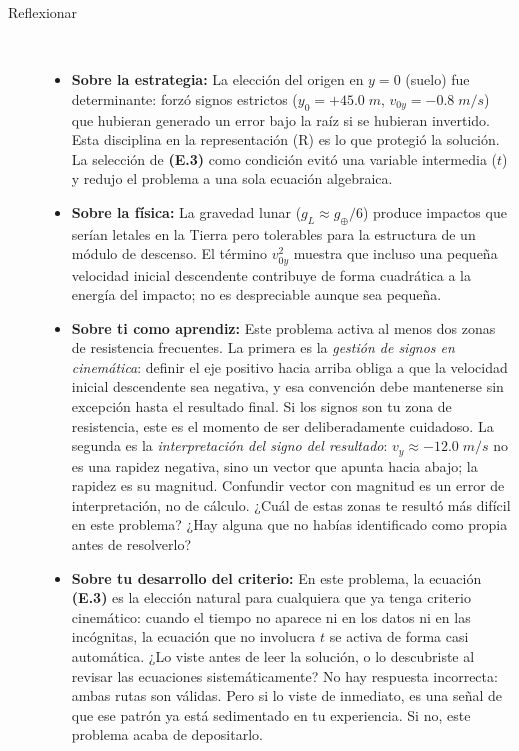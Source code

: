 \documentclass[11pt]{book}
\begin{document}
\begin{enumerate}
\begin{description}
\item[Reflexionar]~
\begin{itemize}
    \item \textbf{Sobre la estrategia:} La elección del origen en $y = 0$ (suelo) fue determinante: forzó signos estrictos ($y_0 = +45.0\;m$, $v_{0y} = -0.8\;m/s$) que hubieran generado un error bajo la raíz si se hubieran invertido. Esta disciplina en la representación (R) es lo que protegió la solución. La selección de \textbf{(E.3)} como condición evitó una variable intermedia ($t$) y redujo el problema a una sola ecuación algebraica.
    \item \textbf{Sobre la física:} La gravedad lunar ($g_L \approx g_\oplus/6$) produce impactos que serían letales en la Tierra pero tolerables para la estructura de un módulo de descenso. El término $v_{0y}^2$ muestra que incluso una pequeña velocidad inicial descendente contribuye de forma cuadrática a la energía del impacto; no es despreciable aunque sea pequeña.
    \item \textbf{Sobre ti como aprendiz:} Este problema activa al menos dos zonas de resistencia frecuentes. La primera es la \textit{gestión de signos en cinemática}: definir el eje positivo hacia arriba obliga a que la velocidad inicial descendente sea negativa, y esa convención debe mantenerse sin excepción hasta el resultado final. Si los signos son tu zona de resistencia, este es el momento de ser deliberadamente cuidadoso. La segunda es la \textit{interpretación del signo del resultado}: $v_y \approx -12.0\;m/s$ no es una rapidez negativa, sino un vector que apunta hacia abajo; la rapidez es su magnitud. Confundir vector con magnitud es un error de interpretación, no de cálculo. ¿Cuál de estas zonas te resultó más difícil en este problema? ¿Hay alguna que no habías identificado como propia antes de resolverlo?

    \item \textbf{Sobre tu desarrollo del criterio:} En este problema, la ecuación \textbf{(E.3)} es la elección natural para cualquiera que ya tenga criterio cinemático: cuando el tiempo no aparece ni en los datos ni en las incógnitas, la ecuación que no involucra $t$ se activa de forma casi automática. ¿Lo viste antes de leer la solución, o lo descubriste al revisar las ecuaciones sistemáticamente? No hay respuesta incorrecta: ambas rutas son válidas. Pero si lo viste de inmediato, es una señal de que ese patrón ya está sedimentado en tu experiencia. Si no, este problema acaba de depositarlo.
\end{itemize}


\end{description}
\end{enumerate}
\end{document}

